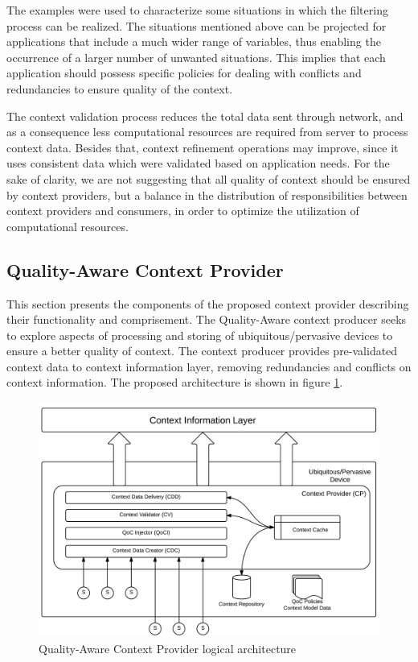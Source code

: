 \documentclass[letterpaper,conference]{IEEEtran}
\begin{document}
 The examples were used to characterize some situations in which the filtering process 
 can be realized. The situations mentioned above can be projected for applications that
 include a much wider range of variables, thus enabling the occurrence of a larger 
 number of unwanted situations. This implies that each application should possess 
 specific policies for dealing with conflicts and redundancies to ensure quality of the 
 context.
 
 The context validation process reduces the total data sent through network, and as a 
 consequence less computational resources are required from server to process context 
 data. Besides that, context refinement operations may improve, since it uses consistent
 data which were validated based on application needs. For the sake of clarity, we are 
 not suggesting that all quality of context should be ensured by context providers, but 
 a balance in the distribution of responsibilities between context providers and 
 consumers, in order to optimize the utilization of computational resources.
 
\subsection{Quality-Aware Context Provider}

This section presents the components of the proposed context provider describing their 
functionality and comprisement. The Quality-Aware context producer seeks to explore 
aspects of processing and storing of ubiquitous/pervasive devices to ensure a better 
quality of context. The context producer provides pre-validated context data to context 
information layer, removing redundancies and conflicts on context information. The 
proposed architecture is shown in figure \ref{qualitymodel}.

\begin{figure}[!ht]
 \centering
  \includegraphics[scale=0.1]{imagens/ClientContextModel}
 \caption{Quality-Aware Context Provider logical architecture}
  \label{qualitymodel}
\end{figure}
\end{document}
